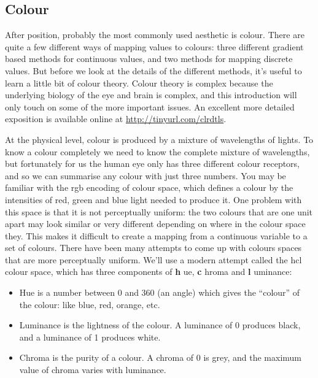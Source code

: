 \subsection{Colour}\label{sub:scale-colour}

After position, probably the most commonly used aesthetic is colour.
There are quite a few different ways of mapping values to colours: three
different gradient based methods for continuous values, and two methods
for mapping discrete values. But before we look at the details of the
different methods, it's useful to learn a little bit of colour theory.
Colour theory is complex because the underlying biology of the eye and
brain is complex, and this introduction will only touch on some of the
more important issues. An excellent more detailed exposition is
available online at \url{http://tinyurl.com/clrdtls}. 

At the physical level, colour is produced by a mixture of wavelengths of
lights. To know a colour completely we need to know the complete mixture
of wavelengths, but fortunately for us the human eye only has three
different colour receptors, and so we can summarise any colour with just
three numbers. You may be familiar with the rgb encoding of colour
space, which defines a colour by the intensities of red, green and blue
light needed to produce it. One problem with this space is that it is
not perceptually uniform: the two colours that are one unit apart may
look similar or very different depending on where in the colour space
they. This makes it difficult to create a mapping from a continuous
variable to a set of colours. There have been many attempts to come up
with colours spaces that are more perceptually uniform. We'll use a
modern attempt called the hcl colour space, which has three components
of \textbf{h} ue, \textbf{c} hroma and \textbf{l} uminance:

\begin{itemize}
\itemsep1pt\parskip0pt
\item
  Hue is a number between 0 and 360 (an angle) which gives the
  ``colour'' of the colour: like blue, red, orange, etc.
\item
  Luminance is the lightness of the colour. A luminance of 0 produces
  black, and a luminance of 1 produces white.
\item
  Chroma is the purity of a colour. A chroma of 0 is grey, and the
  maximum value of chroma varies with luminance.
\end{itemize}

